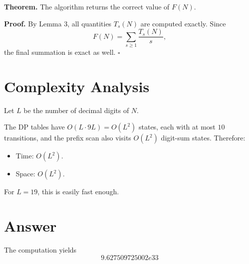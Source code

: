 \documentclass[11pt]{article}
\begin{document}
\textbf{Theorem.} The algorithm returns the correct value of $F(N)$.

\textbf{Proof.} By Lemma 3, all quantities $T_s(N)$ are computed exactly. Since
\[
F(N)=\sum_{s\ge 1}\frac{T_s(N)}{s},
\]
the final summation is exact as well. $\square$

\section{Complexity Analysis}

Let $L$ be the number of decimal digits of $N$.

The DP tables have $O(L\cdot 9L)=O(L^2)$ states, each with at most $10$ transitions, and the prefix scan also visits $O(L^2)$ digit-sum states. Therefore:
\begin{itemize}
\item Time: $O(L^2)$.
\item Space: $O(L^2)$.
\end{itemize}

For $L=19$, this is easily fast enough.

\section{Answer}

The computation yields
\[
\boxed{9.627509725002e33}
\]
\end{document}
